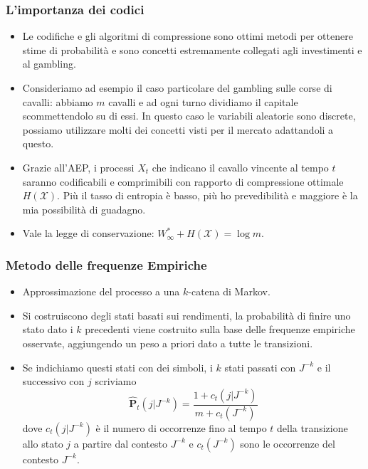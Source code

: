 \documentclass{beamer}
\theoremstyle{plain}
\theoremstyle{definition}
\theoremstyle{remark}
\newcommand{\Ph}{\hat{\mathbf{P}}}
\begin{document}
\begin{frame}[label=Codici]
\frametitle{L'importanza dei codici}
\begin{itemize}
\item Le codifiche e gli algoritmi di compressione sono ottimi metodi per ottenere stime di probabilità e sono concetti estremamente collegati agli investimenti e al gambling.
\item Consideriamo ad esempio il caso particolare del gambling sulle corse di cavalli: abbiamo $m$ cavalli e ad ogni turno dividiamo il capitale scommettendolo su di essi. In questo caso le variabili aleatorie sono discrete, possiamo utilizzare molti dei concetti visti per il mercato adattandoli a questo.
\item Grazie all'AEP, i processi $X_t$ che indicano il cavallo vincente al tempo $t$ saranno codificabili e comprimibili con rapporto di compressione ottimale $H(\mathcal{X})$. Più il tasso di entropia è basso, più ho prevedibilità e maggiore è la mia possibilità di guadagno.
\item Vale la legge di conservazione:
$W^*_\infty +H(\mathcal{X})=\log m$.
\hyperlink{InfTeo}{}

\end{itemize}


\end{frame}
\begin{frame}
\frametitle{Metodo delle frequenze Empiriche}
\begin{itemize}
\item Approssimazione del processo a una $k$-catena di Markov.
\item Si costruiscono degli stati basati sui rendimenti, la probabilità di finire uno stato dato i $k$ precedenti viene costruito sulla base delle frequenze empiriche osservate, aggiungendo un peso a priori dato a tutte le transizioni.
\item Se indichiamo questi stati con dei simboli, i $k$ stati passati con $J^{-k}$ e il successivo con $j$ scriviamo
\begin{equation*}
\Ph_t(j|J^{-k})=\frac{1+c_t(j|J^{-k})}{m+c_t(J^{-k})}
\end{equation*}
dove $c_t(j|J^{-k})$ è il numero di occorrenze fino al tempo $t$ della transizione allo stato $j$ a partire dal contesto $J^{-k}$ e $c_t(J^{-k})$ sono le occorrenze del contesto $J^{-k}$.
\end{itemize}
\end{frame}
\end{document}
